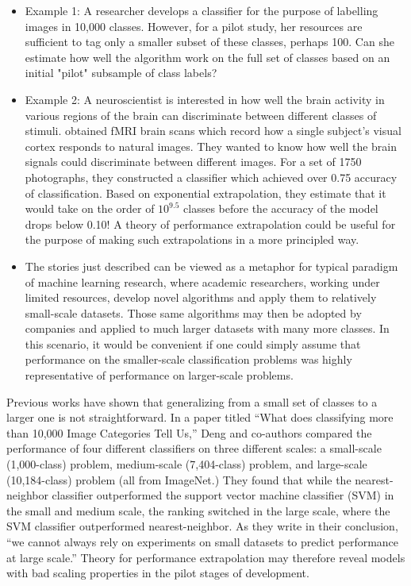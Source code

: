\documentclass[12pt]{article}
\begin{document}
\begin{itemize} 
\item Example 1: A researcher develops a classifier for the purpose of labelling
images in 10,000 classes. However, for a pilot study, her resources are sufficient to 
tag only a smaller subset of these classes, perhaps 100. Can she estimate how well the algorithm 
work on the full set of classes based on an initial "pilot" subsample of class labels?
\item Example 2: A neuroscientist is interested in how well the brain
  activity in various regions of the brain can discriminate between
  different classes of stimuli.  \cite{Kay2008a} obtained fMRI brain
  scans which record how a single subject's visual cortex responds to
  natural images. They wanted to know how well the brain signals could
  discriminate between different images. For a set of 1750
  photographs, they constructed a classifier which achieved over 0.75
  accuracy of classification. Based on exponential extrapolation, they
  estimate that it would take on the order of $10^{9.5}$ classes
  before the accuracy of the model drops below 0.10!  A theory of
  performance extrapolation could be useful for the purpose of making
  such extrapolations in a more principled way.
\item The stories just described can be viewed as a metaphor for
  typical paradigm of machine learning research, where academic
  researchers, working under limited resources, develop novel
  algorithms and apply them to relatively small-scale datasets. Those
  same algorithms may then be adopted by companies and applied to much
  larger datasets with many more classes. In this scenario, it would
  be convenient if one could simply assume that performance on the
  smaller-scale classification problems was highly representative of
  performance on larger-scale problems.
\end{itemize}

Previous works have shown that generalizing from a small set of
classes to a larger one is not straightforward. In a paper titled
``What does classifying more than 10,000 Image Categories Tell Us,''
Deng and co-authors compared the performance of four different
classifiers on three different scales: a small-scale (1,000-class)
problem, medium-scale (7,404-class) problem, and large-scale
(10,184-class) problem (all from ImageNet.)  They found that while the
nearest-neighbor classifier outperformed the support vector machine
classifier (SVM) in the small and medium scale, the ranking switched
in the large scale, where the SVM classifier outperformed
nearest-neighbor.  As they write in their conclusion, ``we cannot
always rely on experiments on small datasets to predict performance at
large scale.'' Theory for performance extrapolation may therefore
reveal models with bad scaling properties in the pilot stages of
development.
\end{document}
